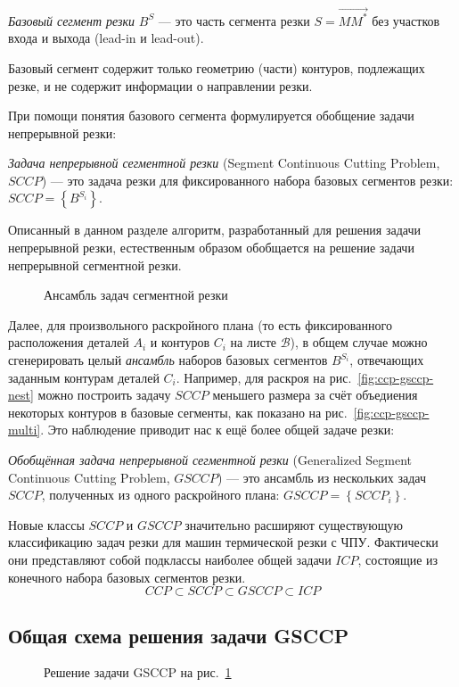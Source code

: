 \textit{Базовый сегмент резки}
$B^S$
---
это часть сегмента резки
$S = \overrightarrow{M M^*}$
без участков входа и выхода
(lead-in и lead-out).

Базовый сегмент содержит только геометрию
(части) контуров, подлежащих резке,
и не содержит информации о направлении резки.

При помощи понятия базового сегмента
формулируется обобщение задачи непрерывной резки:

\textit{Задача непрерывной сегментной резки}
(Segment Continuous Cutting Problem, $SCCP$)
--- это задача резки
для фиксированного набора базовых сегментов резки:
$SCCP = \left\{B^{S_i}\right\}$.

Описанный в данном разделе алгоритм,
разработанный для решения задачи непрерывной резки,
естественным образом обобщается на решение
задачи непрерывной сегментной резки.

\begin{figure}
  \centering
  \caption{Ансамбль задач сегментной резки}
  \label{fig:ccp-gsccp}
\end{figure}

Далее, для произвольного раскройного плана
(то есть фиксированного расположения деталей $A_i$
и контуров $C_i$ на листе $\mathcal B$),
в общем случае можно сгенерировать целый
\textit{ансамбль}
наборов базовых сегментов $B^{S_i}$,
отвечающих заданным контурам деталей $C_i$.
Например,
для раскроя
на рис.~\ref{fig:ccp-gsccp-nest}
можно построить задачу $SCCP$
меньшего размера за счёт
объедиения некоторых контуров в базовые сегменты,
как показано на рис.~\ref{fig:ccp-gsccp-multi}.
Это наблюдение приводит нас к ещё более общей задаче резки:

\textit{Обобщённая задача непрерывной сегментной резки}
(Generalized Segment Continuous Cutting Problem, $GSCCP$)
--- это ансамбль из нескольких задач
$SCCP$,
полученных из одного раскройного плана:
$GSCCP = \left\{ SCCP_i \right\}$.

Новые классы
$SCCP$ и $GSCCP$
значительно расширяют существующую классификацию
задач резки для машин термической резки с ЧПУ.
Фактически они представляют собой подклассы
наиболее общей задачи $ICP$,
состоящие из конечного набора базовых сегментов резки.
$$
CCP \subset SCCP \subset GSCCP \subset ICP
$$

\subsection{Общая схема решения задачи GSCCP}

\begin{figure}
  \centering
  \caption{Решение задачи GSCCP на рис.~\ref{fig:ccp-gsccp}}
  \label{fig:ccp-gsccp-solution}
\end{figure}
